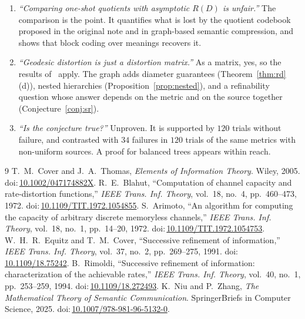\documentclass[11pt]{article}
\newcommand{\doi}[1]{doi:\,\url{#1}}
\theoremstyle{definition}
\theoremstyle{remark}
\begin{document}
\begin{enumerate}
\item \emph{``Comparing one-shot quotients with asymptotic $R(D)$ is unfair.''} The comparison is the point. It quantifies what is lost by the quotient codebook proposed in the original note and in graph-based semantic compression, and shows that block coding over meanings recovers it.
\item \emph{``Geodesic distortion is just a distortion matrix.''} As a matrix, yes, so the results of~\cite{cover2006,niu2025} apply. The graph adds diameter guarantees (Theorem~\ref{thm:rd}(d)), nested hierarchies (Proposition~\ref{prop:nested}), and a refinability question whose answer depends on the metric and on the source together (Conjecture~\ref{conj:sr}).
\item \emph{``Is the conjecture true?''} Unproven. It is supported by $120$ trials without failure, and contrasted with $34$ failures in $120$ trials of the same metrics with non-uniform sources. A proof for balanced trees appears within reach.
\end{enumerate}

\begin{thebibliography}{9}
 T.~M.~Cover and J.~A.~Thomas, \emph{Elements of Information Theory}. Wiley, 2005. \doi{10.1002/047174882X}.
 R.~E.~Blahut, ``Computation of channel capacity and rate-distortion functions,'' \emph{IEEE Trans. Inf. Theory}, vol.~18, no.~4, pp.~460--473, 1972. \doi{10.1109/TIT.1972.1054855}.
 S.~Arimoto, ``An algorithm for computing the capacity of arbitrary discrete memoryless channels,'' \emph{IEEE Trans. Inf. Theory}, vol.~18, no.~1, pp.~14--20, 1972. \doi{10.1109/TIT.1972.1054753}.
 W.~H.~R.~Equitz and T.~M.~Cover, ``Successive refinement of information,'' \emph{IEEE Trans. Inf. Theory}, vol.~37, no.~2, pp.~269--275, 1991. \doi{10.1109/18.75242}.
 B.~Rimoldi, ``Successive refinement of information: characterization of the achievable rates,'' \emph{IEEE Trans. Inf. Theory}, vol.~40, no.~1, pp.~253--259, 1994. \doi{10.1109/18.272493}.
 K.~Niu and P.~Zhang, \emph{The Mathematical Theory of Semantic Communication}. SpringerBriefs in Computer Science, 2025. \doi{10.1007/978-981-96-5132-0}.
\end{thebibliography}
\end{document}
